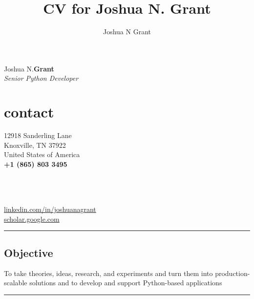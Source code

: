 \documentclass[10pt]{article}%
\author{Joshua N Grant}
\title{CV for Joshua N. Grant}
\begin{document}
\begin{minipage}[ht]{.33\linewidth}%
  \setlength{\headsep}{-10pt}%
  \setlength{\voffset}{-0.75in}%
  {\Large Joshua N.\huge\textbf{Grant}} \\
   \large \textit{Senior Python Developer}
\end{minipage}
\begin{minipage}[ht]{.25\linewidth}%
  \section*{\faUser{} contact}%
  12918 Sanderling Lane \\
  Knoxville, TN 37922 \\
  United States of America \\
  \textbf{+1 (865) 803 3495} \faMobile \\
\end{minipage}
\begin{minipage}[ht]{.5\linewidth}%
  \href{mailto:jngrant@live.com}{\color{linkcolor}{jngrant@live.com \faEnvelope}} \\
  \href{https://notjustadatum.blogspot.com}{\color{linkcolor}{notjustadatum.blogspot.com \faBold}} \\
  \href{https://github.com/sempervent}{\color{linkcolor}{github.com/sempervent \faGithubAlt}} \\
  \href{https://www.linkedin.com/in/joshua-grant-a3842968}{\color{linkcolor} {\small linkedin.com/in/joshuanagrant} \faLinkedin} \\
  \href{https://scholar.google.com/citations?user=vs-HJQcAAAAJ&hl=en}{\color{linkcolor} {scholar.google.com \faPencil}}
\end{minipage}
\par\noindent\rule{\textwidth}{0.4pt}
\begin{center}
\section*{\faBullseye{} Objective}%
To take theories, ideas, research, and experiments and turn them into production-scalable solutions and to develop and support Python-based applications
\end{center}
\par\noindent\rule{\textwidth}{0.4pt}
\end{document}

